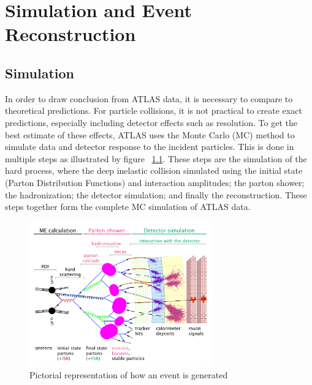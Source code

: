 \chapter{Simulation and Event Reconstruction}
\label{chap:fully} 
\section{Simulation}
In order to draw conclusion from ATLAS data, it is necessary to compare to theoretical predictions. For particle collisions, it is not practical to create exact predictions, especially including detector effects such as resolution. To get the best estimate of these effects, ATLAS uses the Monte Carlo (MC) method to simulate data and detector response to the incident particles. This is done in multiple steps as illustrated by figure ~\ref{fig:eventsim}. These steps are the simulation of the hard process, where the deep inelastic collision simulated using the initial state (Parton Distribution Functions) and interaction amplitudes; the parton shower; the hadronization; the detector simulation; and finally the reconstruction. These steps together form the complete MC simulation of ATLAS data.\newline

\begin{figure}[h]
\begin{center}
\includegraphics*[width=0.70\textwidth] {figures/event_simulation}
\caption[Event generation cartoon]{Pictorial representation of how an event is generated \cite{Wanotayaroj:2242196}}
\label{fig:eventsim}
\end{center}
\end{figure}

